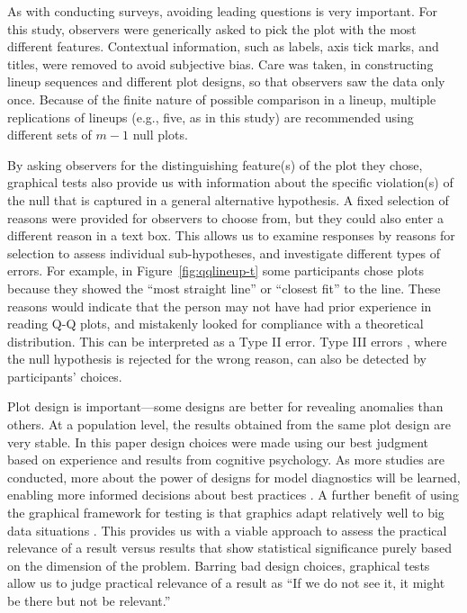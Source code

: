 \documentclass[12pt]{article}
\begin{document}
As with conducting surveys, avoiding leading questions is very important. For this study, observers were generically asked to pick the plot with the most different features. Contextual information, such as labels, axis tick marks, and titles, were removed to avoid subjective bias. Care was taken, in constructing lineup sequences and different plot designs, so that observers saw the data only once. Because of the finite nature of possible comparison in a lineup, multiple replications of lineups (e.g., five, as in this study) are recommended using different sets of $m-1$ null plots. 

By asking observers for the distinguishing feature(s) of the plot they chose,  graphical tests also provide us with information about the specific violation(s) of the null that is captured in a general alternative hypothesis. A fixed selection of reasons were provided for observers to choose from, but they could also enter a different reason in a text box.  This allows us to examine responses by reasons for selection to assess individual sub-hypotheses, and investigate different types of errors. For example, in Figure~\ref{fig:qqlineup-t} some participants chose plots because they showed the ``most straight line'' or ``closest fit'' to the line. These reasons would indicate that the person may not have had prior experience in reading Q-Q plots, and mistakenly looked for compliance with a theoretical distribution. This can be interpreted as a Type II error. Type III errors \citep{mosteller:1948}, where the null hypothesis is rejected for the wrong reason, can also be detected by participants' choices.


Plot design is important---some designs are better for revealing anomalies than others. At a population level, the results obtained from the same plot design are very stable. %
In this paper design choices were made using our best judgment based on  experience and results from cognitive psychology. As more studies are conducted, more about the power of designs for model diagnostics will be learned, enabling more informed decisions about best practices \citep{infovis:2012}. A further benefit of using the graphical framework for testing is that graphics adapt relatively well to big data situations \citep{unwin:million}. This provides us with a viable approach to assess the practical relevance of a result versus results that show statistical significance purely based on the dimension of the problem. Barring bad design choices, graphical tests allow us to judge practical relevance of a result as ``If we do not see it, it might be there but not be relevant.'' 
\end{document}
